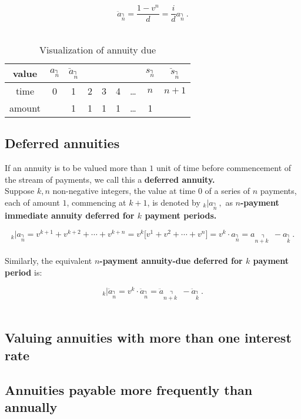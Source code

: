 \documentclass[a4paper, 11pt, twoside]{article}
\begin{document}
\[\ddot{a}_{\annuity{n}} = \frac{1-v^n}{d}=\frac{i}{d}a_{\annuity{n}}\ .\]\\

\begin{table}[htbp!] 
	\centering
	\begin{tabular}{|c|c|c|c|c|c|c|c|c|}
		\hline
		value & $a_{\annuity{n}}$ & $\ddot{a}_{\annuity{n}}$ &  &  &  &  & $s_{\annuity{n}}$ &  $\ddot{s}_{\annuity{n}}$\\
		\hline
		time & 0 & 1 & 2 & 3 & 4 & \dots & $n$ & $n+1$\\
		\hline
		amount &  & 1 & 1 & 1 & 1 & \dots & 1 & \\
		\hline
	\end{tabular}
	\caption{Visualization of annuity due}
\end{table}

\subsection{Deferred annuities}

If an annuity is to be valued more than $1$ unit of time before commencement of the stream of payments, we call this a \textbf{deferred annuity.}\\

Suppose $k,n$ non-negative integers, the value at time $0$ of a series of $n$ payments, each of amount $1$, commencing at $k+1$, is denoted by $_k\big\vert a_{\annuity{n}}\ ,$ as \textbf{$n$-payment immediate annuity deferred for $k$ payment periods.}

\[_k\big\vert a_{\annuity{n}} = v^{k+1} + v^{k+2} + \cdots + v^{k+n} = v^k\big[v^1+v^2+\cdots + v^n\big] = v^k\cdot a_{\annuity{n}} = a_{\annuity{n+k\ \ \ }} - a_{\annuity{k}}\ .\]\\

Similarly, the equivalent \textbf{$n$-payment annuity-due deferred for $k$ payment period} is:

\[_k\big\vert \ddot{a}_{\annuity{n}} = v^k\cdot \ddot{a}_{\annuity{n}} = \ddot{a}_{\annuity{n+k\ \ \ }} - \ddot{a}_{\annuity{k}}\ .\]\\

\subsection{Valuing annuities with more than one interest rate}

\subsection{Annuities payable more frequently than annually}

\subsection{}
\end{document}
